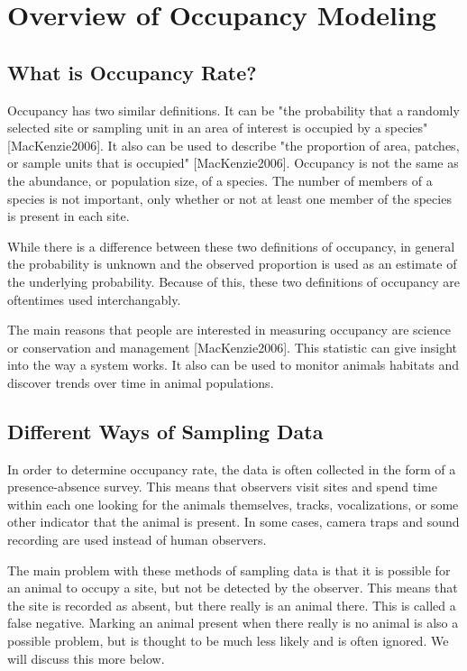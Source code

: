 \documentclass{article}
\begin{document}
\section{Overview of Occupancy Modeling}

	\subsection{What is Occupancy Rate?}

		Occupancy has two similar definitions.  It can be "the probability that a
randomly selected site or sampling unit in an area of interest is occupied by a 
species" [MacKenzie2006].  It also can be used to describe "the proportion of 
area, patches, or sample units that is occupied" [MacKenzie2006].  Occupancy is 
not the same as the abundance, or population size, of a species.  The number of
members of a species is not important, only whether or not at least one member of
the species is present in each site.  
	
	While there is a difference between these two definitions of occupancy, in 
general the probability is unknown and the observed proportion is used as an 
estimate of the underlying probability.  Because of this, these two definitions
of occupancy are oftentimes used interchangably.   
		
	The main reasons that people are interested in measuring occupancy are science
or conservation and management [MacKenzie2006].  This statistic can give insight 
into the way a system works.  It also can be used to monitor animals habitats 
and discover trends over time in animal populations.

	\subsection{Different Ways of Sampling Data}

		In order to determine occupancy rate, the data is often collected in the
 form of a presence-absence survey.  This means that observers visit sites and 
spend time within each one looking for the animals themselves, tracks, 
vocalizations, or some other indicator that the animal is present.  In some cases, 
camera traps and sound recording are used instead of human observers.

	The main problem with these methods of sampling data is that it is possible 
for an animal to occupy a site, but not be detected by the observer.  This means
that the site is recorded as absent, but there really is an animal there.  This 
is called a false negative.  Marking an animal present when there really is no
animal is also a possible problem, but is thought to be much less likely and is
often ignored.  We will discuss this more below.
\end{document}
